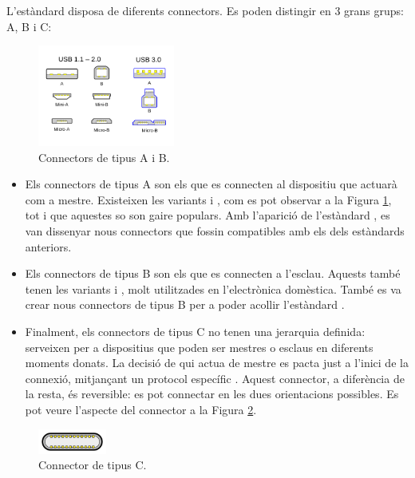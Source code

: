 L'estàndard  disposa de diferents connectors. Es poden distingir en
3 grans grups: A, B i C:

\begin{figure}[ht]
    \centering
    \includegraphics[width=0.4\textwidth]{images/usb_connectors.png}
    \caption{Connectors  de tipus A i B. \cite{Contributors2024USB}}
    \label{fig:usb_connectors}
\end{figure}

\begin{itemize}
    \item Els connectors de tipus A son els que es connecten al dispositiu
    que actuarà com a mestre. Existeixen les variants  i ,
    com es pot observar a la Figura \ref{fig:usb_connectors}, tot i que aquestes
    so son gaire populars. Amb l'aparició de l'estàndard , es van
    dissenyar nous connectors que fossin compatibles amb els dels estàndards
    anteriors.
    \item Els connectors de tipus B son els que es connecten a l'esclau. Aquests
    també tenen les variants  i , molt utilitzades
    en l'electrònica domèstica. També es va crear nous connectors de tipus B
    per a poder acollir l'estàndard .
    \item Finalment, els connectors de tipus C no tenen una jerarquia definida:
    serveixen per a dispositius que poden ser mestres o esclaus en diferents
    moments donats. La decisió de qui actua de mestre es pacta just a l'inici
    de la connexió, mitjançant un protocol específic \cite{Axelson2015USB}.
    Aquest connector, a diferència de la resta, és reversible: es pot connectar
    en les dues orientacions possibles. Es pot veure l'aspecte del connector
    a la Figura \ref{fig:usb_connectors_c}.
\end{itemize}

\begin{figure}[ht]
    \centering
    \includegraphics[width=0.2\textwidth]{images/usb_c.png}
    \caption{Connector  de tipus C. \cite{Contributors2024USB}}
    \label{fig:usb_connectors_c}
\end{figure}

